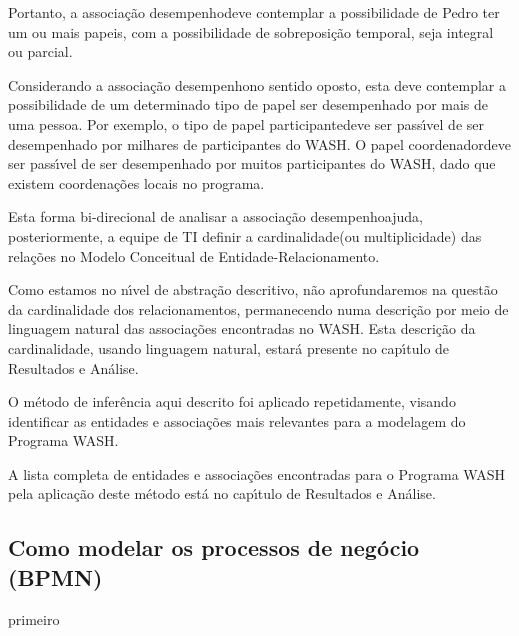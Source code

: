 \documentclass[
12pt,		%
openright,	%
twoside,  %
a4paper,			%
chapter=TITLE,		%
english,			%
french,				%
spanish,			%
brazil				%
]{USPSC-classe/USPSC}
\begin{document}
 Portanto, a associa\c{c}\~ao \textquotedbl desempenho\textquotedbl  deve contemplar a possibilidade de Pedro ter um ou mais papeis, com a possibilidade de sobreposi\c{c}\~ao temporal, seja integral ou parcial.




Considerando a associa\c{c}\~ao \textquotedbl desempenho\textquotedbl  no sentido oposto, esta deve contemplar a possibilidade de um determinado tipo de papel ser desempenhado por mais de uma pessoa. Por exemplo, o tipo de papel \textquotedbl participante\textquotedbl  deve ser pass\'{\i}vel de ser desempenhado por milhares de participantes do WASH. O papel \textquotedbl coordenador\textquotedbl  deve ser pass\'{\i}vel de ser desempenhado por muitos participantes do WASH, dado que existem coordena\c{c}\~oes locais no programa.




Esta forma bi-direcional de analisar a associa\c{c}\~ao \textquotedbl desempenho\textquotedbl  ajuda, posteriormente, a equipe de TI definir a \textquotedbl cardinalidade\textquotedbl  (ou multiplicidade) das rela\c{c}\~oes no Modelo Conceitual de Entidade-Relacionamento.




Como estamos no n\'{\i}vel de abstra\c{c}\~ao descritivo, n\~ao aprofundaremos na quest\~ao da cardinalidade dos relacionamentos, permanecendo numa descri\c{c}\~ao por meio de linguagem natural das associa\c{c}\~oes encontradas no WASH. Esta descri\c{c}\~ao da cardinalidade, usando linguagem natural, estar\'a presente no cap\'{\i}tulo de Resultados e An\'alise.




O m\'etodo de infer\^encia aqui descrito foi aplicado repetidamente, visando identificar as entidades e associa\c{c}\~oes mais relevantes para a modelagem do Programa WASH.




A lista completa de entidades e associa\c{c}\~oes encontradas para o Programa WASH pela aplica\c{c}\~ao deste m\'etodo est\'a no cap\'{\i}tulo de Resultados e An\'alise.




\subsection[Como modelar os processos de neg\'ocio (BPMN)]{Como modelar os processos de neg\'ocio (BPMN)}\label{Como modelar os processos de neg\'ocio (BPMN)}
primeiro
\end{document}
